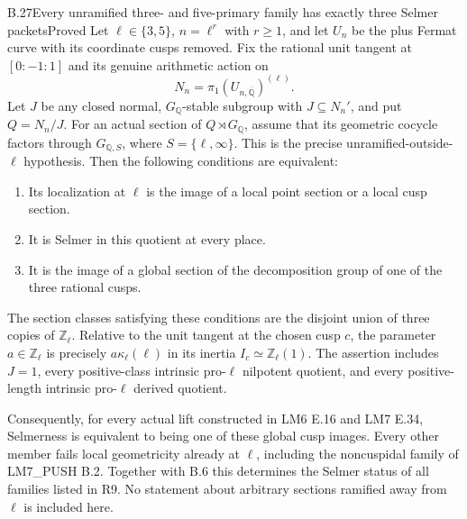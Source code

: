 \begin{statement}{B.27}{Every unramified three- and five-primary family has exactly three Selmer packets}{Proved}
Let $\ell\in\{3,5\}$, $n=\ell^r$ with $r\geq1$, and
let $U_n$ be the plus Fermat curve with its coordinate
cusps removed. Fix the rational unit tangent at
$[0:-1:1]$ and its genuine arithmetic action on
\[
 N_n=\pi_1(U_{n,\overline{\mathbb Q}})^{(\ell)}.
\]
Let $J$ be any closed normal, $G_{\mathbb Q}$-stable
subgroup with $J\subseteq N_n'$, and put $Q=N_n/J$.
For an actual section of $Q\rtimes G_{\mathbb Q}$,
assume that its geometric cocycle factors through
$G_{\mathbb Q,S}$, where $S=\{\ell,\infty\}$.
This is the precise unramified-outside-$\ell$ hypothesis.
Then the following conditions are equivalent:

\begin{enumerate}
\item Its localization at $\ell$ is the image of a
local point section or a local cusp section.
\item It is Selmer in this quotient at every place.
\item It is the image of a global section of the
decomposition group of one of the three rational cusps.
\end{enumerate}
The section classes satisfying these conditions are
the disjoint union of three copies of $\mathbb Z_\ell$.
Relative to the unit tangent at the chosen cusp $c$,
the parameter $a\in\mathbb Z_\ell$ is precisely
$a\kappa_\ell(\ell)$ in its inertia
$I_c\simeq\mathbb Z_\ell(1)$.
The assertion includes $J=1$, every positive-class
intrinsic pro-$\ell$ nilpotent quotient, and every
positive-length intrinsic pro-$\ell$ derived quotient.

Consequently, for every actual lift constructed in
LM6 E.16 and LM7 E.34, Selmerness is equivalent to
being one of these global cusp images. Every other
member fails local geometricity already at $\ell$,
including the noncuspidal family of LM7\_PUSH B.2.
Together with B.6 this determines the Selmer status
of all families listed in R9. No statement about
arbitrary sections ramified away from $\ell$ is
included here.
\end{statement}
